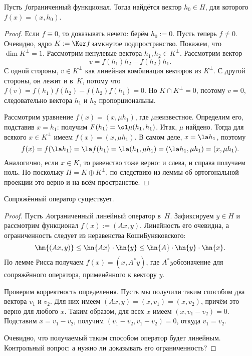 \documentclass[a4paper]{article}
\begin{document}
\begin{lemma}[Рисса]
Пусть $f$\т ограниченный функционал. Тогда найдётся вектор $h_0 \in H$, для которого $f(x) = (x,h_0)$.
\end{lemma}
\begin{proof}
Если $f \equiv 0$, то доказывать нечего: берём $h_0 := 0$. Пусть теперь $f \neq 0$.
Очевидно, ядро $K := \Ker f$\т замкнутое подпространство. Покажем, что $\dim K^\bot = 1$.
Рассмотрим ненулевые вектора $h_1, h_2 \in K^\bot$. Рассмотрим вектор
$$v = f(h_1)h_2 - f(h_2)h_1.$$
С одной стороны,
$v \in K^\bot$ как линейная комбинация векторов из $K^\bot$. С другой стороны, он лежит и в~$K$, потому что
$f(v) = f(h_1)f(h_2) - f(h_2)f(h_1) = 0$. Но $K \cap K^\bot = 0$, поэтому $v = 0$, следовательно
вектора $h_1$ и $h_2$ пропорциональны.

Рассмотрим уравнение $f(x) = (x, \mu h_1)$, где $\mu$\т неизвестное.
Определим его, подставив $x = h_1$: получим $F(h_1) = \ol \mu (h_1,h_1)$. Итак, $\mu$ найдено.
Тогда для всякого $x \in K^\bot$ имеем $f(x) = (x, \mu h_1)$. В самом деле, $x = \la h_1$, поэтому
$$f(x) = f(\la h_1) = \la f(h_1) = \la (h_1,\mu h_1) = (\la h_1,\mu h_1) = (x,\mu h_1).$$
Аналогично, если $x \in K$, то равенство тоже верно: и слева, и справа получаем ноль. Но поскольку $H = K\oplus K^\bot$,
по следствию из леммы об ортогональной проекции это верно и на всём пространстве.
\end{proof}

\begin{stm}
Сопряжённый оператор существует.
\end{stm}
\begin{proof}
Пусть $A$\т ограниченный линейный оператор в~$H$.
Зафиксируем $y \in H$ и рассмотрим функционал $f(x) := (Ax,y)$. Линейность его очевидна,
а ограниченность следует из неравенства Коши\ч Буняковского:
$$\hm{(Ax,y)} \le \hn{Ax}\cdot \hn{y} \le \hn{A}\cdot \hn{y} \cdot \hn{x}.$$
По лемме Рисса получаем $f(x) = (x,A^*y)$, где $A^*y$\т обозначение для сопряжённого оператора,
применённого к вектору $y$.

Проверим корректность определения. Пусть мы получили таким способом два
вектора $v_1$ и $v_2$. Для них имеем $(Ax,y) = (x,v_1) = (x,v_2)$,
причём это верно для любого $x$. Таким образом, для всех $x$ имеем $(x, v_1 - v_2) = 0$.
Подставим $x = v_1 - v_2$, получим $(v_1-v_2, v_1-v_2) = 0$, откуда $v_1 = v_2$.

Очевидно, что получаемый таким способом оператор будет линейным. Контрольный вопрос:
а нужно ли доказывать его ограниченность?
\end{proof}
\end{document}
